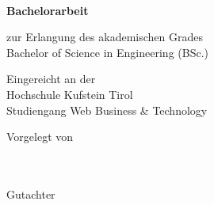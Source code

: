 \begin{titlepage}
\begin{center}
\vfill

\begin{minipage}{1\textwidth}
\begin{center}
\onehalfspacing
\Huge \textsf{\textbf{\mytitle}}
\end{center}
\end{minipage}

\vfill

{\LARGE \textsf{\textbf{\\ Bachelorarbeit}}}

\large
zur Erlangung des akademischen Grades \\
Bachelor of Science in Engineering (BSc.)

\vspace{1em}

Eingereicht an der \\
Hochschule Kufstein Tirol\\
Studiengang Web Business \& Technology

\vspace{1em}

Vorgelegt von\\
\autor \\
\personalnummer \\

\vspace{1em}

Gutachter \\
\betreuer 

\vspace{1.5em}

\abgabedat


\end{center}
\end{titlepage}

